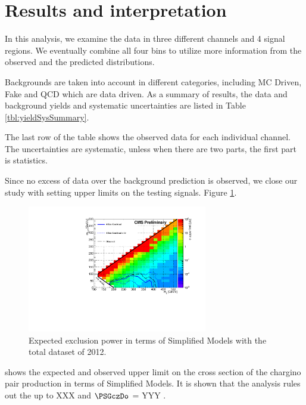 \section{Results and interpretation}
\label{sect:stat}
In this analysis, we examine the data in three different channels and 4 signal regions.
We eventually combine all four bins to utilize more information from the observed and the predicted distributions.

Backgrounds are taken into account in different categories, including MC Driven, Fake and QCD which are data driven.
As a summary of results, the data and background yields and systematic uncertainties are listed in Table \ref{tbl:yieldSysSummary}. 

The last row of the table shows the observed data for  each individual channel.  The uncertainties are systematic, unless when there are 
two parts, the first part is statistics.

Since no excess of data over the background prediction is observed, 
we close our study with setting upper limits on the testing signals.
Figure \ref{fig:limit_final}. 
\begin{linenomath}
\begin{figure}[h]
\centering
\includegraphics[width=0.7\textwidth,keepaspectratio=true]{StatisticsFig/Exclusion4Bins.pdf}
\caption{Expected exclusion power in terms of Simplified Models
with the total dataset of 2012. 
}
\label{fig:limit_final}
\end{figure}
\end{linenomath}
shows the expected and observed upper limit on the cross section of the chargino pair production in terms of Simplified Models.%
It is shown that the analysis rules out the \chione up to XXX \GeV and  $\PSGczDo$ = YYY \GeV.


